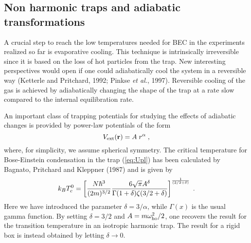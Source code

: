 \subsection{Non harmonic traps and adiabatic transformations}
\label{sec:nonharmonic}

A crucial step to reach the low temperatures needed for BEC in the
experiments realized so far is evaporative cooling. This
technique is intrinsically irreversible since it is based on the loss
of hot particles from the trap. New interesting perspectives would
open if one could adiabatically cool the system in a reversible way
(Ketterle and Pritchard, 1992; Pinkse {\it et al.}, 1997).
Reversible cooling  of the gas is achieved by adiabatically
changing the shape of the trap at a rate slow compared to the internal
equilibration rate.

An important class of trapping potentials for studying the effects
of adiabatic changes is provided by power-law potentials of the form
\begin{equation}
V_{\rm ext}({\bf r}) = A \; r^\alpha \;,
\label{eq:Upl}
\end{equation}
where, for simplicity, we assume spherical symmetry. The critical
temperature for Bose-Einstein condensation in the trap (\ref{eq:Upl})
has been calculated by Bagnato, Pritchard and Kleppner (1987) and is 
given by
\begin{equation}
k_BT_c^0 = \left[ \frac{N\hbar^3}{(2m)^{3/2}}
\frac{6\sqrt{\pi}A^\delta} {\Gamma(1+\delta)\zeta(3/2+\delta)}
\right]^{1 \over (3/2+\delta) } \;.
\label{eq:Tcpl}
\end{equation}
Here we have introduced the parameter $\delta=3/\alpha$, while
$\Gamma(x)$ is the usual gamma function.  By setting $\delta=3/2$ and 
$A=m\omega_{\rm ho}^2/2$, one recovers the  result for the transition
temperature in an isotropic harmonic trap. The result
for a rigid box is instead obtained  by letting $\delta\to 0$.


